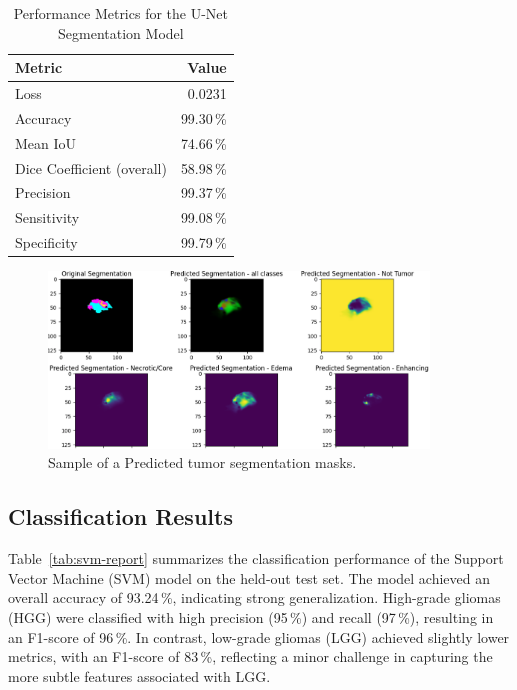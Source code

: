 \begin{table}[ht]
  \centering
  \caption{Performance Metrics for the U-Net Segmentation Model}
  \label{tab:segmentation-results}
  \begin{tabular}{l r}
    \hline
    \textbf{Metric}            & \textbf{Value} \\
    \hline
    Loss                       & 0.0231         \\
    Accuracy                   & 99.30\,\%      \\
    Mean IoU                   & 74.66\,\%      \\
    Dice Coefficient (overall) & 58.98\,\%      \\
    Precision                  & 99.37\,\%      \\
    Sensitivity                & 99.08\,\%      \\
    Specificity                & 99.79\,\%      \\
    \hline
  \end{tabular}
\end{table}

\begin{figure}[h]
  \centering
  \includegraphics[width=0.9\textwidth]{Images/Chapter3/seg.png}
  \caption{Sample of a Predicted tumor segmentation masks.}
  \label{fig:segmentation-example}
\end{figure}


\subsection{Classification Results}
\label{sec:classification-results}

Table~\ref{tab:svm-report} summarizes the classification performance of the Support Vector Machine (SVM) model on the held-out test set. The model achieved an overall accuracy of 93.24\,\%, indicating strong generalization. High-grade gliomas (HGG) were classified with high precision (95\,\%) and recall (97\,\%), resulting in an F1-score of 96\,\%. In contrast, low-grade gliomas (LGG) achieved slightly lower metrics, with an F1-score of 83\,\%, reflecting a minor challenge in capturing the more subtle features associated with LGG.

